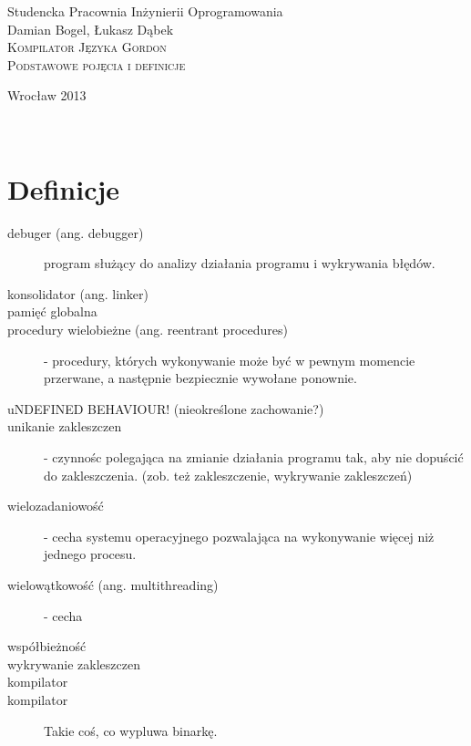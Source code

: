 \documentclass[12pt]{article}
\begin{document}
\begin{titlepage}
\begin{center}
Studencka Pracownia Inżynierii Oprogramowania\\[3.5cm]

Damian Bogel, Łukasz Dąbek\\[1cm]
\textsc{\LARGE Kompilator Języka Gordon}\\[1cm]
\textsc{\large Podstawowe pojęcia i definicje}

\vfill
Wrocław 2013

\end{center}
\end{titlepage}

\newpage
\setcounter{page}{2}
~
\newpage

\section{Definicje}
\begin{description}
	\item[debuger (ang. debugger)] program służący do analizy działania programu i wykrywania błędów.
	\item[konsolidator (ang. linker)] 
	\item[pamięć globalna]
	\item[procedury wielobieżne (ang. reentrant procedures)] - procedury, których wykonywanie może być w pewnym momencie przerwane, a następnie bezpiecznie wywołane ponownie.
	\item[uNDEFINED BEHAVIOUR! (nieokreślone zachowanie?)]
	\item[unikanie zakleszczen] - czynnośc polegająca na zmianie działania programu tak, aby nie dopuścić do zakleszczenia. (zob. też zakleszczenie, wykrywanie zakleszczeń)
	\item[wielozadaniowość] - cecha systemu operacyjnego pozwalająca na wykonywanie więcej niż jednego procesu.
	\item[wielowątkowość (ang. multithreading)] - cecha
	\item[współbieżność]
	\item[wykrywanie zakleszczen]
	\item[kompilator]
    \item[kompilator] Takie coś, co wypluwa binarkę.
\end{description}
\end{document}
